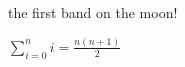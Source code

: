 \documentclass{article}
\begin{document}
the first band on the moon!

\newpage

$\sum_{i=0}^{n} i = \frac{n(n+1)}{2}$
\end{document}
